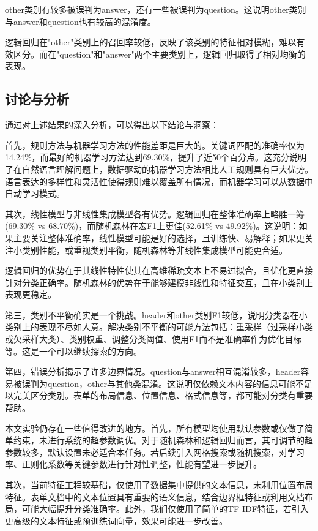 \documentclass[12pt,a4paper]{article}
\begin{document}
other类别有较多被误判为answer，还有一些被误判为question。这说明other类别与answer和question也有较高的混淆度。

逻辑回归在"other"类别上的召回率较低，反映了该类别的特征相对模糊，难以有效区分。而在"question"和"answer"两个主要类别上，逻辑回归取得了相对均衡的表现。

\subsection{讨论与分析}

通过对上述结果的深入分析，可以得出以下结论与洞察：

首先，规则方法与机器学习方法的性能差距是巨大的。关键词匹配的准确率仅为14.24\%，而最好的机器学习方法达到69.30\%，提升了近50个百分点。这充分说明了在自然语言理解问题上，数据驱动的机器学习方法相比人工规则具有巨大优势。语言表达的多样性和灵活性使得规则难以覆盖所有情况，而机器学习可以从数据中自动学习模式。

其次，线性模型与非线性集成模型各有优势。逻辑回归在整体准确率上略胜一筹(69.30\% vs 68.70\%)，而随机森林在宏F1上更佳(52.61\% vs 49.92\%)。这说明：如果主要关注整体准确率，线性模型可能是好的选择，且训练快、易解释；如果更关注小类别性能，或重视类别平衡，随机森林等非线性集成模型可能更合适。

逻辑回归的优势在于其线性特性使其在高维稀疏文本上不易过拟合，且优化更直接针对分类正确率。随机森林的优势在于能够建模非线性和特征交互，且在小类别上表现更稳定。

第三，类别不平衡确实是一个挑战。header和other类别F1较低，说明分类器在小类别上的表现不尽如人意。解决类别不平衡的可能方法包括：重采样（过采样小类或欠采样大类）、类别权重、调整分类阈值、使用F1而不是准确率作为优化目标等。这是一个可以继续探索的方向。

第四，错误分析揭示了许多边界情况。question与answer相互混淆较多，header容易被误判为question，other与其他类混淆。这说明仅依赖文本内容的信息可能不足以完美区分类别。表单的布局信息、位置信息、格式信息等，都可能对分类有重要帮助。

本文实验仍存在一些值得改进的地方。首先，所有模型均使用默认参数或仅做了简单约束，未进行系统的超参数调优。对于随机森林和逻辑回归而言，其可调节的超参数较多，默认设置未必适合本任务。若后续引入网格搜索或随机搜索，对学习率、正则化系数等关键参数进行针对性调整，性能有望进一步提升。

其次，当前特征工程较基础，仅使用了数据集中提供的文本信息，未利用位置布局特征。表单文档中的文本位置具有重要的语义信息，结合边界框特征或利用文档布局，可能大幅提升分类准确率。此外，我们仅使用了简单的TF-IDF特征，若引入更高级的文本特征或预训练词向量，效果可能进一步改善。
\end{document}
